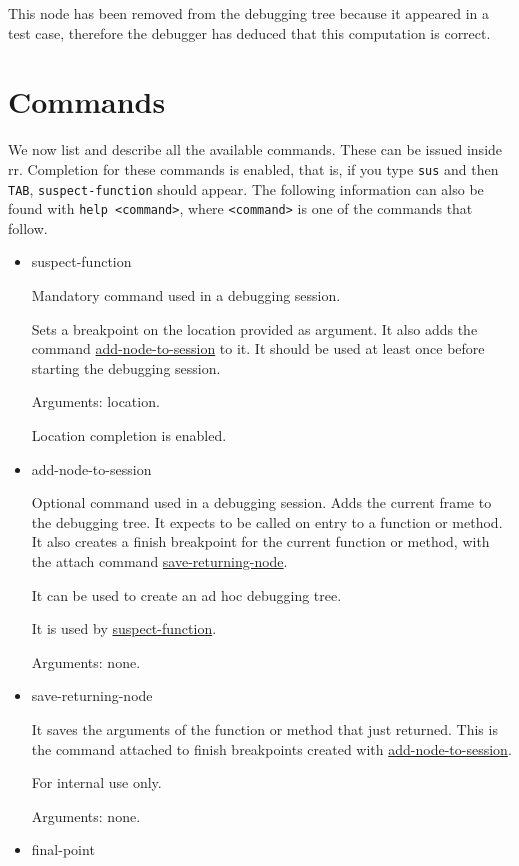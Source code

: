 This node has been removed from the debugging tree because it appeared in a test case, therefore the debugger has deduced that this computation is correct.

\section{Commands}
We now list and describe all the available commands. These can be issued inside rr. Completion for these commands is enabled, that is, if you type \verb|sus| and then \verb|TAB|, \verb|suspect-function| should appear.
The following information can also be found with \verb|help <command>|, where \verb|<command>| is one of the commands that follow.

\begin{itemize}
    \item suspect-function
\label{command:suspect-function}

Mandatory command used in a debugging session.

Sets a breakpoint on the location provided as argument. It also adds the command \hyperref[command:add-node-to-session]{add-node-to-session} to it.
It should be used at least once before starting the debugging session.

Arguments: location.

Location completion is enabled.


\item add-node-to-session
\label{command:add-node-to-session}

Optional command used in a debugging session.
Adds the current frame to the debugging tree.
It expects to be called on entry to a function or method.
It also creates a finish breakpoint for the current function or method, with the attach command \hyperref[command:save-returning-node]{save-returning-node}.

It can be used to create an ad hoc debugging tree.

It is used by \hyperref[command:suspect-function]{suspect-function}.

Arguments: none.
\item save-returning-node
\label{command:save-returning-node}

It saves the arguments of the function or method that just returned.
This is the command attached to finish breakpoints created with \hyperref[command:add-node-to-session]{add-node-to-session}.

For internal use only.

Arguments: none.
\item final-point
\label{command:final-point}


\end{itemize}
